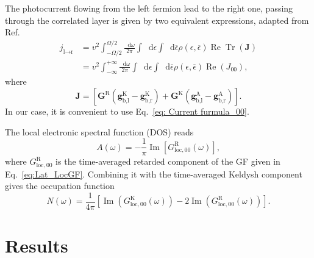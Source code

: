 \documentclass[aps,prb,groupedaddress,showpacs,twocolumn,superscriptaddress,10pt]{revtex4-2}
\newcommand*\dd{\mathop{}\!\mathrm{d}}
\newcommand{\mat}[1]{\bm{#1}} %
\DeclareMathOperator*{\rre}{Re}
\DeclareMathOperator*{\iim}{Im}
\DeclareMathOperator*{\Tr}{Tr}
\begin{document}
The photocurrent flowing from the left fermion lead to the right one, passing through the correlated layer is given by two equivalent expressions, adapted from Ref.~\cite{so.do.18}
% 
\begin{align}
j_{\text{l}\rightarrow\text{r}}&=v^2\int_{-\Omega/2}^{\Omega/2}\frac{\dd\omega}{2\pi} \int \dd\epsilon \int \dd\overline{\epsilon} \rho(\epsilon,\overline{\epsilon}) \rre\Tr(\mat{J})\label{eq: Current furmula_Omega}\\
&= v^2\int_{-\infty}^{+\infty}\frac{\dd\omega}{2\pi} \int \dd\epsilon \int \dd\overline{\epsilon} \rho(\epsilon,\overline{\epsilon}) \rre(J_{00}),\label{eq: Current furmula_00}
\end{align}
% 
where
% 
\begin{equation}
  \mat{J}=\left[\mat{G}^{\text{R}}(\mat{g}_{\text{b},\text{l}}^{\text{K}}-\mat{g}_{\text{b},\text{r}}^{\text{K}})+\mat{G}^{\text{K}}(\mat{g}_{\text{b},\text{l}}^{\text{A}}-\mat{g}_{\text{b},\text{r}}^{\text{A}})\right].
\end{equation}
% 
In our case, it is convenient to use Eq.~\eqref{eq: Current furmula_00}. 

The local electronic spectral function (DOS) reads
%  
\begin{equation}
\label{eq:el_spectral_function}
 A(\omega)=-\frac{1}{\pi}\iim[G_{\text{loc},00}^{\text{R}}(\omega)],
\end{equation}
% 
where $G^{\text{R}}_{\text{loc},00}$ is the time-averaged retarded component of the GF given in Eq.~\eqref{eq:Lat_LocGF}. Combining it with the time-averaged Keldysh component gives the occupation function
\begin{equation}
N(\omega) = \frac{1}{4\pi} [\iim(G^{\text{K}}_{\text{loc},00}(\omega))-2\iim(G^{\text{R}}_{\text{loc},00}(\omega))].
\end{equation}

\section{Results}
\label{sec:results}          
     
\end{document}
